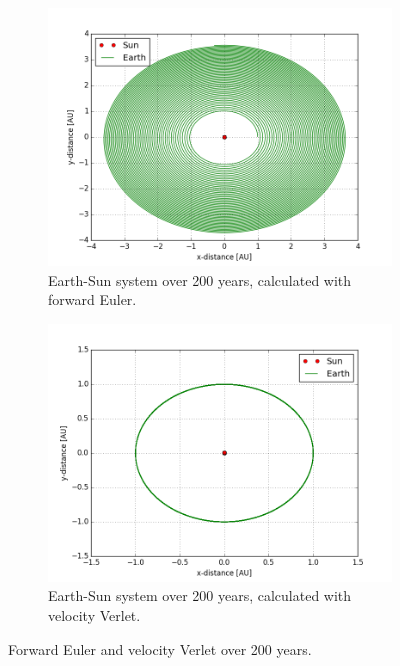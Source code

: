 \documentclass[10pt,showpacs,preprintnumbers,footinbib,amsmath,amssymb,aps,prl,twocolumn,groupedaddress,superscriptaddress,showkeys]{revtex4-1}
\begin{document}
\newpage

\begin{figure}
	\centering
	\begin{subfigure}[b]{0.4\textwidth}
		\includegraphics[width=\textwidth]{earth_sun_200yr_euler.png}
		\caption{Earth-Sun system over 200 years, calculated with forward Euler.}
		\label{fig:e_s_euler}
	\end{subfigure}
    \begin{subfigure}[b]{0.4\textwidth}
		\includegraphics[width=\textwidth]{earth_sun_200yr_verlet.png}
		\caption{Earth-Sun system over 200 years, calculated with velocity Verlet.}
		\label{fig:e_s_verlet}
	\end{subfigure}
	\caption{Forward Euler and velocity Verlet over 200 years.}
    \label{fig:euler_vs_verlet}
\end{figure}
\end{document}
